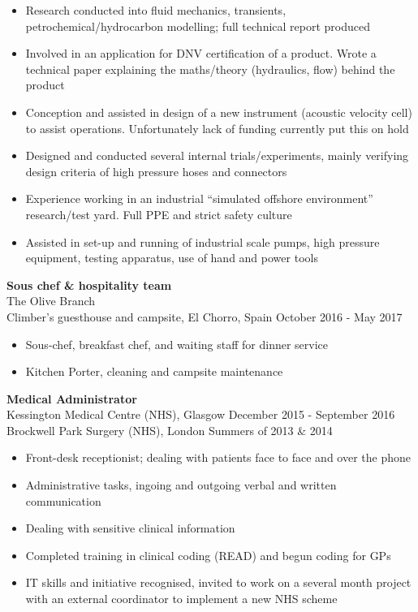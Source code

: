 \documentclass[margin, line, 10pt]{res} %
\begin{document}
\begin{resume}
\begin{itemize}
\item Research conducted into fluid mechanics, transients, petrochemical/hydrocarbon modelling; full technical report produced

\item Involved in an application for DNV certification of a product. Wrote a technical paper explaining the maths/theory (hydraulics, flow) behind the product

\item Conception and assisted in design of a new instrument (acoustic velocity cell) to assist operations. Unfortunately lack of funding currently put this on hold

\item Designed and conducted several internal trials/experiments, mainly verifying design criteria of high pressure hoses and connectors 

\item Experience working in an industrial ``simulated offshore environment'' research/test yard. Full PPE and strict safety culture 

\item Assisted in set-up and running of industrial scale pumps, high pressure equipment, testing apparatus, use of hand and power tools

\end{itemize}

\textbf{Sous chef \& hospitality team} \\
The Olive Branch\\
Climber's guesthouse and campsite, El Chorro, Spain \hfill October 2016 - May 2017\\
\begin{itemize} \itemsep -2pt %
\item Sous-chef, breakfast chef, and waiting staff for dinner service 
\item Kitchen Porter, cleaning and campsite maintenance
\end{itemize}

\textbf{Medical Administrator} \\
Kessington Medical Centre (NHS), Glasgow \hfill December 2015 - September 2016\\
Brockwell Park Surgery (NHS), London \hfill Summers of 2013 \& 2014 \\
\begin{itemize} \itemsep -2pt %
\item Front-desk receptionist; dealing with patients face to face and over the phone
\item Administrative tasks, ingoing and outgoing verbal and written communication
\item Dealing with sensitive clinical information
\item Completed training in clinical coding (READ) and begun coding for GPs
\item IT skills and initiative recognised, invited to work on a several month project with an external coordinator to implement a new NHS scheme
\end{itemize}
 

\end{resume}
\end{document}
